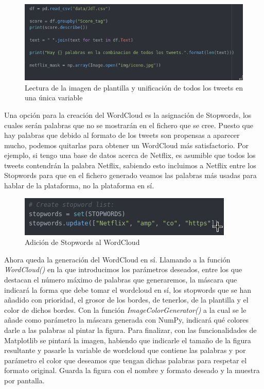 \begin{figure}[H]
	\centering
	\includegraphics[scale=.5]{imagenes/lectura-imagen-words.png}
	\caption{Lectura de la imagen de plantilla y unificación de todos los tweets en una única variable}
	\label{fig:include-words}
\end{figure}


Una opción para la creación del WordCloud es la asignación de Stopwords, los cuales serán palabras que no se mostrarán en el fichero que se cree. Puesto que hay palabras que debido al formato de los tweets son propensas a aparecer mucho, podemos quitarlas para obtener un WordCloud más satisfactorio. Por ejemplo, si tengo una base de datos acerca de Netflix, es asumible que todos los tweets contendrán la palabra Netflix, sabiendo esto incluimos a Netflix entre los Stopwords para que en el fichero generado veamos las palabras más usadas para hablar de la plataforma, no la plataforma en sí. 

\begin{figure}[H]
	\centering
	\includegraphics[scale=.7]{imagenes/stopword.png}
	\caption{Adición de Stopwords al WordCloud}
	\label{fig:stopwords}
\end{figure}


Ahora queda la generación del WordCloud en sí. Llamando a la función \textit{WordCloud()} en la que introducimos los parámetros deseados, entre los que destacan el número máximo de palabras que generaremos, la máscara que indicará la forma que debe tomar el wordcloud en sí, los stopwords que se han añadido con prioridad, el grosor de los bordes, de tenerlos, de la plantilla y el color de dichos bordes. Con la función \textit{ImageColorGenerator()} a la cual se le añade como parámetro la máscara generada con NumPy, indicará qué colores darle a las palabras al pintar la figura. Para finalizar, con las funcionalidades de Matplotlib se pintará la imagen, habiendo que indicarle el tamaño de la figura resultante y pasarle la variable de wordcloud que contiene las palabras y por parámetro el color que deseamos que tengan dichas palabras para respetar el formato original. Guarda la figura con el nombre y formato deseado y la muestra por pantalla. 

